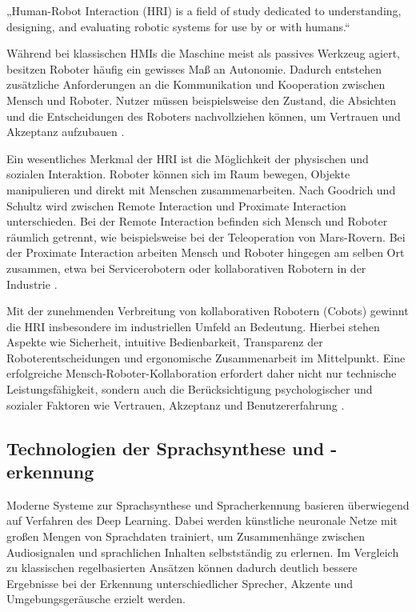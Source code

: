 „Human-Robot Interaction (HRI) is a field of study dedicated to understanding, designing, and evaluating robotic systems for use by or with humans.“ \cite{goodrich2008hri}

Während bei klassischen HMIs die Maschine meist als passives Werkzeug agiert, besitzen Roboter häufig ein gewisses Maß an Autonomie. Dadurch entstehen zusätzliche Anforderungen an die Kommunikation und Kooperation zwischen Mensch und Roboter. Nutzer müssen beispielsweise den Zustand, die Absichten und die Entscheidungen des Roboters nachvollziehen können, um Vertrauen und Akzeptanz aufzubauen \cite{sheridan2016human,bartneck2020hri}.

Ein wesentliches Merkmal der HRI ist die Möglichkeit der physischen und sozialen Interaktion. Roboter können sich im Raum bewegen, Objekte manipulieren und direkt mit Menschen zusammenarbeiten. Nach Goodrich und Schultz wird zwischen Remote Interaction und Proximate Interaction unterschieden. Bei der Remote Interaction befinden sich Mensch und Roboter räumlich getrennt, wie beispielsweise bei der Teleoperation von Mars-Rovern. Bei der Proximate Interaction arbeiten Mensch und Roboter hingegen am selben Ort zusammen, etwa bei Servicerobotern oder kollaborativen Robotern in der Industrie \cite{goodrich2008hri}.

Mit der zunehmenden Verbreitung von kollaborativen Robotern (Cobots) gewinnt die HRI insbesondere im industriellen Umfeld an Bedeutung. Hierbei stehen Aspekte wie Sicherheit, intuitive Bedienbarkeit, Transparenz der Roboterentscheidungen und ergonomische Zusammenarbeit im Mittelpunkt. Eine erfolgreiche Mensch-Roboter-Kollaboration erfordert daher nicht nur technische Leistungsfähigkeit, sondern auch die Berücksichtigung psychologischer und sozialer Faktoren wie Vertrauen, Akzeptanz und Benutzererfahrung \cite{bartneck2020hri,johnson2024basic}.



\subsection{Technologien der Sprachsynthese und -erkennung}

Moderne Systeme zur Sprachsynthese und Spracherkennung basieren überwiegend auf Verfahren des Deep Learning. Dabei werden künstliche neuronale Netze mit großen Mengen von Sprachdaten trainiert, um Zusammenhänge zwischen Audiosignalen und sprachlichen Inhalten selbstständig zu erlernen. Im Vergleich zu klassischen regelbasierten Ansätzen können dadurch deutlich bessere Ergebnisse bei der Erkennung unterschiedlicher Sprecher, Akzente und Umgebungsgeräusche erzielt werden. \cite{hinton2012deep}

